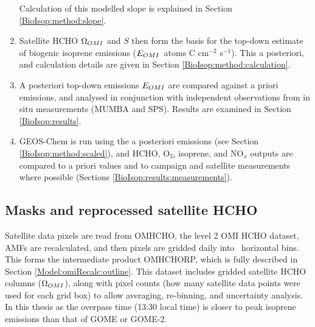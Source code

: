 \begin{enumerate}
        Calculation of this modelled slope is explained in Section \ref{BioIsop:method:slope}.
      \item 
        Satellite HCHO $\Omega_{OMI}$ and $S$ then form the basis for the top-down estimate of biogenic isoprene emissions ($E_{OMI}$~atoms C cm$^{-2}$ s$^{-1}$).
        This  a posteriori, and calculation details are given in Section \ref{BioIsop:method:calculation}.
      \item 
        A posteriori top-down emissions $E_{OMI}$ are compared against a priori emissions, and analysed in conjunction with independent observations from in situ measurements (MUMBA and SPS).
        Results are examined in Section \ref{BioIsop:results}.
      \item 
        GEOS-Chem is run using the a posteriori emissions (see Section \ref{BioIsop:method:scaled}), and HCHO, O$_3$, isoprene, and NO$_x$ outputs are compared to a priori values and to campaign and satellite measurements where possible (Sections \ref{BioIsop:results:measurements}).
    \end{enumerate}
    
  
  \subsection{Masks and reprocessed satellite HCHO}
    
    Satellite data pixels are read from OMHCHO, the level 2 OMI HCHO dataset, AMFs are recalculated, and then pixels are gridded daily into \highhr ~horizontal bins. 
    This forms the intermediate product OMHCHORP, which is fully described in Section \ref{Model:omiRecalc:outline}.
    This dataset includes gridded satellite HCHO columns ($\Omega_{OMI}$), along with pixel counts (how many satellite data points were used for each grid box) to allow averaging, re-binning, and uncertainty analysis.
    In this thesis  
    as the overpass time (13:30 local time) is closer to peak isoprene emissions than that of GOME or GOME-2. %
    
